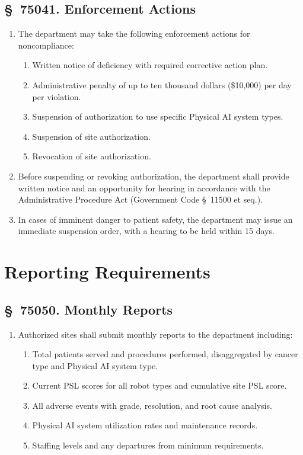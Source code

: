 \documentclass[11pt,letterpaper]{article}
\begin{document}
\subsection{\S~75041. Enforcement Actions}

\begin{enumerate}[label=(\alph*)]
\item The department may take the following enforcement actions for
  noncompliance:
  \begin{enumerate}[label=(\arabic*)]
  \item Written notice of deficiency with required corrective action plan.
  \item Administrative penalty of up to ten thousand dollars (\$10,000) per
    day per violation.
  \item Suspension of authorization to use specific Physical AI system types.
  \item Suspension of site authorization.
  \item Revocation of site authorization.
  \end{enumerate}

\item Before suspending or revoking authorization, the department shall provide
  written notice and an opportunity for hearing in accordance with the
  Administrative Procedure Act (Government Code \S~11500 et seq.).

\item In cases of imminent danger to patient safety, the department may issue
  an immediate suspension order, with a hearing to be held within 15 days.
\end{enumerate}

\section{Reporting Requirements}

\subsection{\S~75050. Monthly Reports}

\begin{enumerate}[label=(\alph*)]
\item Authorized sites shall submit monthly reports to the department including:
  \begin{enumerate}[label=(\arabic*)]
  \item Total patients served and procedures performed, disaggregated by
    cancer type and Physical AI system type.
  \item Current PSL scores for all robot types and cumulative site PSL score.
  \item All adverse events with grade, resolution, and root cause analysis.
  \item Physical AI system utilization rates and maintenance records.
  \item Staffing levels and any departures from minimum requirements.
  \end{enumerate}
\end{enumerate}
\end{document}
